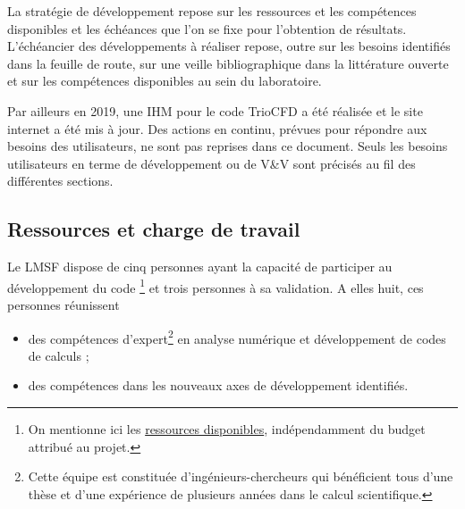 La strat\'egie de d\'eveloppement repose sur les ressources et les comp\'etences disponibles et les \'ech\'eances que l'on se fixe pour l'obtention de r\'esultats. L'\'ech\'eancier des d\'eveloppements \`a r\'ealiser repose, outre sur les besoins identifi\'es dans la feuille de route,  sur une veille bibliographique dans la litt\'erature ouverte et sur les comp\'etences disponibles au sein du laboratoire.

Par ailleurs en 2019, une IHM pour le code TrioCFD a \'et\'e r\'ealis\'ee et le site internet a \'et\'e mis \`a jour. Des actions en continu, pr\'evues pour r\'epondre aux besoins des utilisateurs, ne sont pas reprises dans ce document. Seuls les besoins utilisateurs en terme de d\'eveloppement ou de V\&V sont pr\'ecis\'es au fil des diff\'erentes sections.

\subsection{Ressources et charge de travail}
\label{section-ressource}

Le LMSF dispose de cinq personnes ayant la capacit\'e de participer au d\'eveloppement du code \footnote{On mentionne ici les  {\underline{ ressources disponibles}}, ind\'ependamment du budget attribu\'e au projet.} et trois personnes \`a sa validation. A elles huit, ces personnes r\'eunissent 
\begin{itemize}
\item
des comp\'etences d'expert\footnote{Cette \'equipe est constitu\'ee d'ing\'enieurs-chercheurs qui b\'en\'eficient tous d'une th\`ese et d'une exp\'erience de plusieurs ann\'ees dans le calcul scientifique.} en analyse num\'erique et d\'eveloppement de codes de calculs ;
\item
des comp\'etences dans les nouveaux axes de d\'eveloppement identifi\'es.
\end{itemize}

